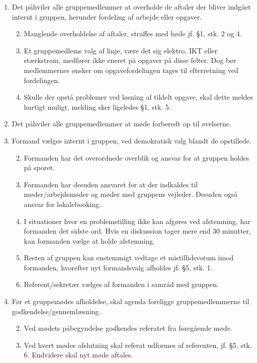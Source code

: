 \documentclass[a4paper,11pt,fleqn,dvipsnames,oneside,openright]{memoir} 	%
\begin{document}
\begin{enumerate}[label=\bfseries § \arabic*.]
	\item Det påhviler alle gruppemedlemmer at overholde de aftaler der bliver indgået internt i gruppen, herunder fordeling af arbejde eller opgaver.
		\begin{enumerate} [label=\bfseries stk. \arabic*.]
		\setcounter{enumii}{1}
		\item Manglende overholdelse af aftaler, straffes med bøde jf. §1, stk. 2 og 4.
		\item Et gruppemedlems valg af linje, være det sig elektro, IKT eller stærkstrøm, medfører ikke eneret på opgaver på disse felter. Dog bør medlemmernes ønsker om opgavefordelingen tages til efterretning ved fordelingen.
		\item Skulle der opstå problemer ved løsning af tildelt opgave, skal dette meldes hurtigt muligt, melding sker ligeledes §1, stk. 5.
		\end{enumerate}	
	
	\item Det påhviler alle gruppemedlemmer at møde forberedt op til øvelserne.
		\setcounter{enumii}{1}
	
	\item Formand vælges internt i gruppen, ved demokratisk valg blandt de opstillede.
		\begin{enumerate}[label=\bfseries stk. \arabic*.]
		\setcounter{enumii}{1}
		\item Formanden har det overordnede overblik og ansvar for at gruppen holdes på sporet.
		\item Formanden har desuden ansvaret for at der indkaldes til møder/arbejdsmøder og møder med gruppens vejleder. Desuden også ansvar for lokalebooking.
		\item I situationer hvor en problemstilling ikke kan afgøres ved afstemning, har formanden det sidste ord. Hvis en diskussion tager mere end 30 minutter, kan formanden vælge at holde afstemning.
		\item Resten af gruppen kan enstemmigt vedtage et mistillidsvotum imod formanden, hvorefter nyt formandsvalg afholdes jf. §5, stk. 1.
		\item Referent/sekretær vælges af formanden i samråd med gruppen.
		\end{enumerate}

	\item Før et gruppemødes afholdelse, skal agenda foreligge gruppemedlemmerne til godkendelse/gennemlæsning.
		\begin{enumerate}[label=\bfseries stk. \arabic*.]
		\setcounter{enumii}{1}
		\item Ved mødets påbegyndelse godkendes referatet fra foregående møde.
		\item Ved hvert mødes afslutning skal referat udformes af referenten, jf. §5, stk. 6. Endvidere skal nyt møde aftales. 
		\end{enumerate}

			
\end{enumerate}


\end{document}
